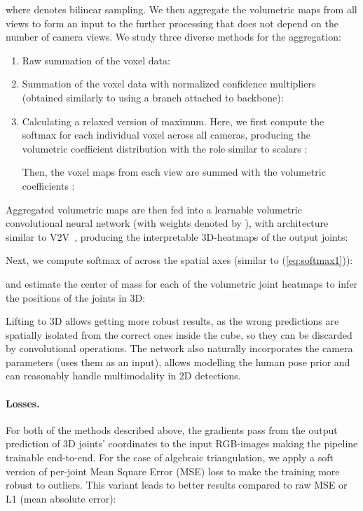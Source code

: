 \documentclass[10pt,twocolumn,letterpaper]{article}
\newcommand{\eq}[1]{(\ref{eq:#1})}
\begin{document}
where  denotes bilinear sampling.
We then aggregate the volumetric maps from all views to form an input to the further processing that does not depend on the number of camera views. We study three diverse methods for the aggregation:
\begin{enumerate}
\item Raw summation of the voxel data: 

\item Summation of the voxel data with normalized confidence multipliers  (obtained similarly to  using a branch attached to backbone): 

\item Calculating a relaxed version of maximum. Here, we first compute the softmax for each individual voxel  across all cameras, producing the volumetric coefficient distribution  with the role similar to scalars :

Then, the voxel maps from each view are summed with the volumetric coefficients :

\end{enumerate}

Aggregated volumetric maps are then fed into a learnable volumetric convolutional neural network  (with weights denoted by ), with architecture similar to V2V~\cite{Moon_2018_CVPR_V2V-PoseNet}, producing the interpretable 3D-heatmaps of the output joints:


Next, we compute softmax of  across the spatial axes (similar to \eq{softmax1}): 

and estimate the center of mass for each of the volumetric joint heatmaps to infer the positions of the joints in 3D: 



Lifting to 3D allows getting more robust results, as the wrong predictions are spatially isolated from the correct ones inside the cube, so they can be discarded by convolutional operations. The network also naturally incorporates the camera parameters (uses them as an input), allows modelling the human pose prior and can reasonably handle multimodality in 2D detections.



\paragraph{Losses.} For both of the methods described above, the gradients pass from the output prediction of 3D joints' coordinates  to the input RGB-images  making the pipeline trainable end-to-end. For the case of algebraic triangulation, we apply a soft version of per-joint Mean Square Error (MSE) loss to make the training more robust to outliers. This variant leads to better results compared to raw MSE or L1 (mean absolute error):
\end{document}
